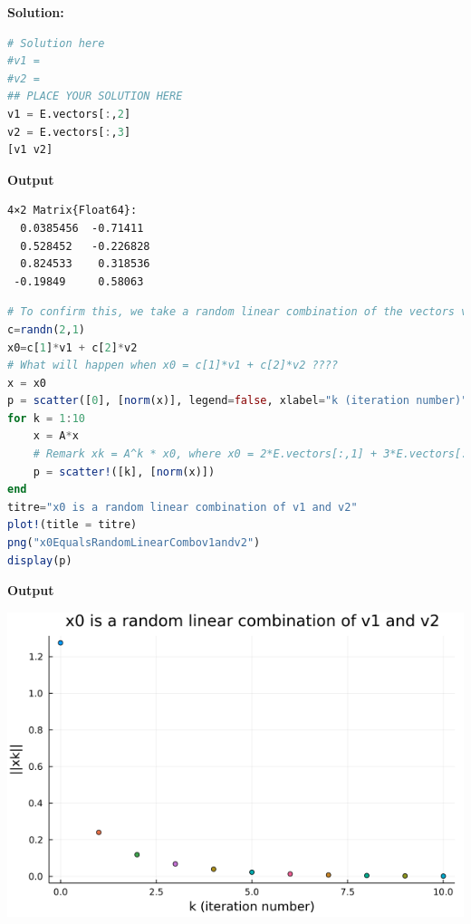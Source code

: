 \textbf{Solution:}

\begin{lstlisting}[language=Julia,style=mystyle]
# Solution here
#v1 =
#v2 = 
## PLACE YOUR SOLUTION HERE
v1 = E.vectors[:,2]
v2 = E.vectors[:,3]
[v1 v2]
\end{lstlisting}
\textbf{Output} 
\begin{verbatim}
4×2 Matrix{Float64}:
  0.0385456  -0.71411
  0.528452   -0.226828
  0.824533    0.318536
 -0.19849     0.58063
\end{verbatim}

\begin{lstlisting}[language=Julia,style=mystyle]
# To confirm this, we take a random linear combination of the vectors v1 and v2
c=randn(2,1)
x0=c[1]*v1 + c[2]*v2
# What will happen when x0 = c[1]*v1 + c[2]*v2 ????
x = x0
p = scatter([0], [norm(x)], legend=false, xlabel="k (iteration number)", ylabel="||xk||")
for k = 1:10
    x = A*x
    # Remark xk = A^k * x0, where x0 = 2*E.vectors[:,1] + 3*E.vectors[:,3]
    p = scatter!([k], [norm(x)])
end
titre="x0 is a random linear combination of v1 and v2"
plot!(title = titre)
png("x0EqualsRandomLinearCombov1andv2")
display(p)
\end{lstlisting}
\textbf{Output} 
\begin{center}
\includegraphics[width=0.6\columnwidth]{graphics/Chap08/x0EqualsRandomLinearCombov1andv2.png} 
\end{center} 








